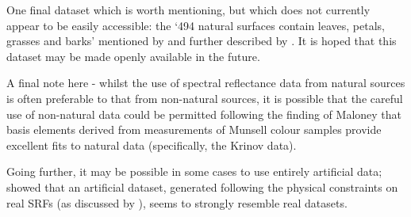 One final dataset which is worth mentioning, but which does not currently appear to be easily accessible: the `494 natural surfaces contain leaves, petals, grasses and barks' mentioned by \citet{cheung_color_2004} and further described by \citet{macdonald_realistic_2014}. It is hoped that this dataset may be made openly available in the future.


A final note here - whilst the use of spectral reflectance data from natural sources is often preferable to that from non-natural sources, it is possible that the careful use of non-natural data could be permitted following the finding of Maloney \cite{maloney_evaluation_1986} that basis elements derived from measurements of Munsell colour samples provide excellent fits to natural data (specifically, the Krinov data).

Going further, it may be possible in some cases to use entirely artificial data; \citet{chen_physical_2005} showed that an artificial dataset, generated following the physical constraints on real \glspl{SRF} (as discussed by \citet{nassau_physics_2001}), seems to strongly resemble real datasets.